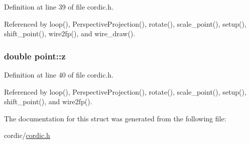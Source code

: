 Definition at line 39 of file cordic.\+h.



Referenced by loop(), Perspective\+Projection(), rotate(), scale\+\_\+point(), setup(), shift\+\_\+point(), wire2fp(), and wire\+\_\+draw().

\subsubsection[{\texorpdfstring{z}{z}}]{\setlength{\rightskip}{0pt plus 5cm}double point\+::z}\hypertarget{structpoint_aab1f0c3682401083b5bf252e7001874f}{}\label{structpoint_aab1f0c3682401083b5bf252e7001874f}


Definition at line 40 of file cordic.\+h.



Referenced by loop(), Perspective\+Projection(), rotate(), scale\+\_\+point(), setup(), shift\+\_\+point(), and wire2fp().



The documentation for this struct was generated from the following file\+:\begin{DoxyCompactItemize}
\item 
cordic/\hyperlink{cordic_8h}{cordic.\+h}\end{DoxyCompactItemize}

